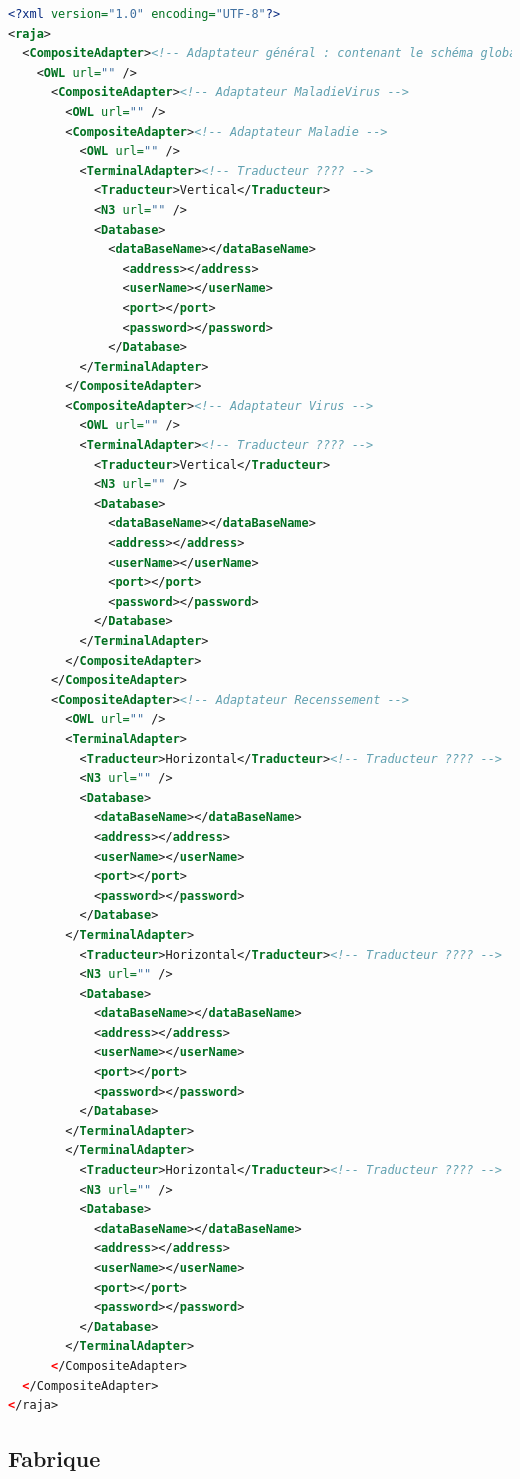 \documentclass[12pt]{article}
\begin{document}
\begin{lstlisting}[language=XML]
<?xml version="1.0" encoding="UTF-8"?>
<raja>
  <CompositeAdapter><!-- Adaptateur général : contenant le schéma global -->
    <OWL url="" />
      <CompositeAdapter><!-- Adaptateur MaladieVirus -->
        <OWL url="" />
        <CompositeAdapter><!-- Adaptateur Maladie -->
          <OWL url="" />
          <TerminalAdapter><!-- Traducteur ???? -->
            <Traducteur>Vertical</Traducteur>
            <N3 url="" />
            <Database>
              <dataBaseName></dataBaseName>
                <address></address>
                <userName></userName>
                <port></port>
                <password></password>
              </Database>
          </TerminalAdapter>
        </CompositeAdapter>
        <CompositeAdapter><!-- Adaptateur Virus -->
          <OWL url="" />
          <TerminalAdapter><!-- Traducteur ???? -->
            <Traducteur>Vertical</Traducteur>
            <N3 url="" />
            <Database>
              <dataBaseName></dataBaseName>
              <address></address>
              <userName></userName>
              <port></port>
              <password></password>
            </Database>
          </TerminalAdapter>
        </CompositeAdapter>
      </CompositeAdapter>
      <CompositeAdapter><!-- Adaptateur Recenssement -->
        <OWL url="" />
        <TerminalAdapter>
          <Traducteur>Horizontal</Traducteur><!-- Traducteur ???? -->
          <N3 url="" />
          <Database>
            <dataBaseName></dataBaseName>
            <address></address>
            <userName></userName>
            <port></port>
            <password></password>
          </Database>
        </TerminalAdapter>
          <Traducteur>Horizontal</Traducteur><!-- Traducteur ???? -->
          <N3 url="" />
          <Database>
            <dataBaseName></dataBaseName>
            <address></address>
            <userName></userName>
            <port></port>
            <password></password>
          </Database>
        </TerminalAdapter>
        </TerminalAdapter>
          <Traducteur>Horizontal</Traducteur><!-- Traducteur ???? -->
          <N3 url="" />
          <Database>
            <dataBaseName></dataBaseName>
            <address></address>
            <userName></userName>
            <port></port>
            <password></password>
          </Database>
        </TerminalAdapter>
      </CompositeAdapter>
  </CompositeAdapter>
</raja>
\end{lstlisting}

\subsection{Fabrique}
\end{document}
